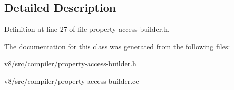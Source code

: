 \subsection{Detailed Description}


Definition at line 27 of file property-\/access-\/builder.\+h.



The documentation for this class was generated from the following files\+:\begin{DoxyCompactItemize}
\item 
v8/src/compiler/property-\/access-\/builder.\+h\item 
v8/src/compiler/property-\/access-\/builder.\+cc\end{DoxyCompactItemize}
